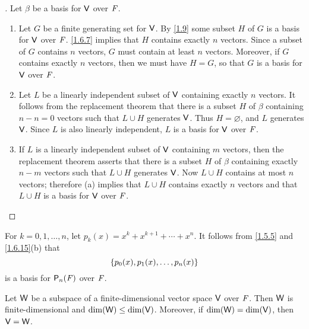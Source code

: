 \begin{proof}[]
  Let \(\beta\) be a basis for \(\mathsf{V}\) over \(\mathit{F}\).
  \begin{enumerate}
    \item Let \(G\) be a finite generating set for \(\mathsf{V}\).
          By \cref{1.9} some subset \(H\) of \(G\) is a basis for \(\mathsf{V}\) over \(\mathit{F}\).
          \cref{1.6.7} implies that \(H\) contains exactly \(n\) vectors.
          Since a subset of \(G\) contains \(n\) vectors, \(G\) must contain at least \(n\) vectors.
          Moreover, if \(G\) contains exactly \(n\) vectors, then we must have \(H = G\), so that \(G\) is a basis for \(\mathsf{V}\) over \(\mathit{F}\).
    \item Let \(L\) be a linearly independent subset of \(\mathsf{V}\) containing exactly \(n\) vectors.
          It follows from the replacement theorem that there is a subset \(H\) of \(\beta\) containing \(n - n = 0\) vectors such that \(L \cup H\) generates \(\mathsf{V}\).
          Thus \(H = \varnothing\), and \(L\) generates \(\mathsf{V}\).
          Since \(L\) is also linearly independent, \(L\) is a basis for \(\mathsf{V}\) over \(\mathit{F}\).
    \item If \(L\) is a linearly independent subset of \(\mathsf{V}\) containing \(m\) vectors, then the replacement theorem asserts that there is a subset \(H\) of \(\beta\) containing exactly \(n - m\) vectors such that \(L \cup H\) generates \(\mathsf{V}\).
          Now \(L \cup H\) contains at most \(n\) vectors;
          therefore (a) implies that \(L \cup H\) contains exactly \(n\) vectors and that \(L \cup H\) is a basis for \(\mathsf{V}\) over \(\mathit{F}\).
  \end{enumerate}
\end{proof}

\begin{eg}\label{1.6.16}
  For \(k = 0, 1, \dots, n\), let \(p_k(x) = x^k + x^{k + 1} + \cdots + x^n\).
  It follows from \cref{1.5.5} and \cref{1.6.15}(b) that
  \[
    \left\lbrace p_0(x), p_1(x), \dots, p_n(x)\right\rbrace
  \]
  is a basis for \(\ps[n]{\F}\) over \(\mathit{F}\).
\end{eg}

\begin{thm}\label{1.11}
  Let \(\mathsf{W}\) be a subspace of a finite-dimensional vector space \(\mathsf{V}\) over \(\mathit{F}\).
  Then \(\mathsf{W}\) is finite-dimensional and \(\dim(\mathsf{W}) \leq \dim(\mathsf{V})\).
  Moreover, if \(\dim(\mathsf{W}) = \dim(\mathsf{V})\), then \(\mathsf{V} = \mathsf{W}\).
\end{thm}

